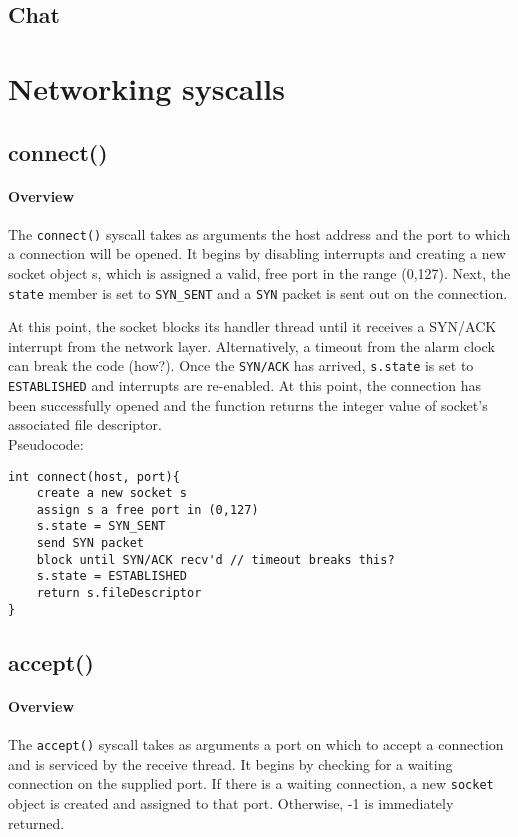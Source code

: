 \documentclass[]{article}
\begin{document}
\subsection{Chat}

\section{Networking syscalls}
\subsection{connect()}

\paragraph{Overview}
The \texttt{connect()} syscall takes as arguments the host address and the port to which a connection will be opened. It begins by disabling interrupts and creating a new socket object s, which is assigned a valid, free port in the range (0,127). Next, the \texttt{state} member is set to \texttt{SYN\_SENT} and a \texttt{SYN} packet is sent out on the connection. 

At this point, the socket blocks its handler thread until it receives a SYN/ACK interrupt from the network layer. Alternatively, a timeout from the alarm clock can break the code (how?). Once the \texttt{SYN/ACK} has arrived, \texttt{s.state} is set to \texttt{ESTABLISHED} and interrupts are re-enabled. At this point, the connection has been successfully opened and the function returns the integer value of socket's associated file descriptor. \\






\noindent Pseudocode:

\begin{lstlisting}
int connect(host, port){
	create a new socket s
	assign s a free port in (0,127)
	s.state = SYN_SENT
	send SYN packet
	block until SYN/ACK recv'd // timeout breaks this?
	s.state = ESTABLISHED
	return s.fileDescriptor
}
\end{lstlisting}

\subsection{accept()}
\paragraph{Overview}
The \texttt{accept()} syscall takes as arguments a port on which to accept a connection and is serviced by the receive thread. It begins by checking for a waiting connection on the supplied port. If there is a waiting connection, a new \texttt{socket} object is created and assigned to that port. Otherwise, -1 is immediately returned.
\end{document}
